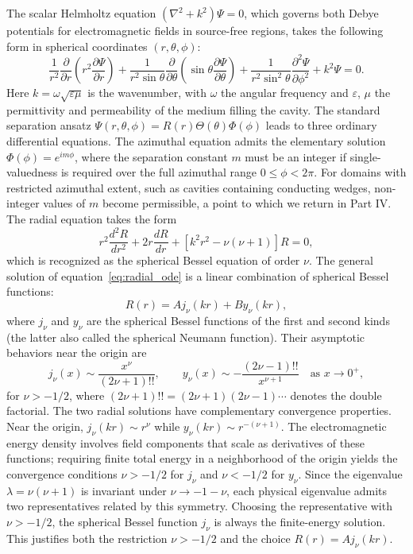 \documentclass[
  aip,
  amsmath,amssymb,
  preprint
]{revtex4-1}
\begin{document}
The scalar Helmholtz equation $(\nabla^2 + k^2)\Psi = 0$, which governs both Debye potentials for electromagnetic fields in source-free regions, takes the following form in spherical coordinates $(r, \theta, \phi)$:
\begin{equation}
\frac{1}{r^2}\frac{\partial}{\partial r}\left(r^2\frac{\partial\Psi}{\partial r}\right) + \frac{1}{r^2\sin\theta}\frac{\partial}{\partial\theta}\left(\sin\theta\frac{\partial\Psi}{\partial\theta}\right) + \frac{1}{r^2\sin^2\theta}\frac{\partial^2\Psi}{\partial\phi^2} + k^2\Psi = 0.
\label{eq:helmholtz_spherical}
\end{equation}
Here $k = \omega\sqrt{\varepsilon\mu}$ is the wavenumber, with $\omega$ the angular frequency and $\varepsilon$, $\mu$ the permittivity and permeability of the medium filling the cavity. The standard separation ansatz $\Psi(r,\theta,\phi) = R(r)\Theta(\theta)\Phi(\phi)$ leads to three ordinary differential equations. The azimuthal equation admits the elementary solution $\Phi(\phi) = e^{im\phi}$, where the separation constant $m$ must be an integer if single-valuedness is required over the full azimuthal range $0 \leq \phi < 2\pi$. For domains with restricted azimuthal extent, such as cavities containing conducting wedges, non-integer values of $m$ become permissible, a point to which we return in Part IV. The radial equation takes the form
\begin{equation}
r^2\frac{d^2R}{dr^2} + 2r\frac{dR}{dr} + [k^2r^2 - \nu(\nu+1)]R = 0,
\label{eq:radial_ode}
\end{equation}
which is recognized as the spherical Bessel equation of order $\nu$. The general solution of equation~\eqref{eq:radial_ode} is a linear combination of spherical Bessel functions:
\begin{equation}
R(r) = A j_\nu(kr) + B y_\nu(kr),
\label{eq:radial_general}
\end{equation}
where $j_\nu$ and $y_\nu$ are the spherical Bessel functions of the first and second kinds (the latter also called the spherical Neumann function). Their asymptotic behaviors near the origin are
\begin{equation}
j_\nu(x) \sim \frac{x^\nu}{(2\nu+1)!!}, \qquad y_\nu(x) \sim -\frac{(2\nu-1)!!}{x^{\nu+1}} \quad \text{as } x \to 0^+,
\label{eq:bessel_asymptotics}
\end{equation}
for $\nu > -1/2$, where $(2\nu+1)!! = (2\nu+1)(2\nu-1)\cdots$ denotes the double factorial. The two radial solutions have complementary convergence properties. Near the origin, $j_\nu(kr) \sim r^\nu$ while $y_\nu(kr) \sim r^{-(\nu+1)}$. The electromagnetic energy density involves field components that scale as derivatives of these functions; requiring finite total energy in a neighborhood of the origin yields the convergence conditions $\nu > -1/2$ for $j_\nu$ and $\nu < -1/2$ for $y_\nu$. Since the eigenvalue 
$\lambda = \nu(\nu+1)$ is invariant under $\nu \to -1-\nu$, each physical 
eigenvalue admits two representatives related by this symmetry. Choosing 
the representative with $\nu > -1/2$, the spherical Bessel function $j_\nu$ 
is always the finite-energy solution. This justifies both the restriction 
$\nu > -1/2$ and the choice $R(r) = A j_\nu(kr)$.
\end{document}
